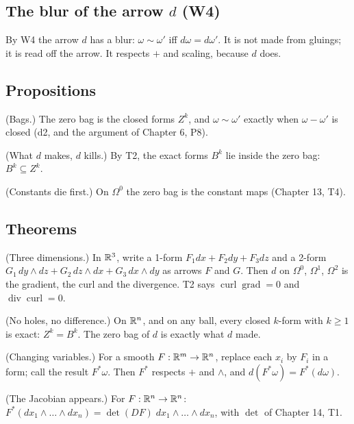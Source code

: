 \subsection*{The blur of the arrow $d$ (W4)}

By W4 the arrow $d$ has a blur: $\omega \sim \omega'$ iff $d\omega = d\omega'$. It is not made from gluings; it is read off the arrow. It respects $+$ and scaling, because $d$ does.

\subsection*{Propositions}

\begin{lines}
\item[\lab{P1}] (Bags.) The zero bag is the closed forms $Z^k$, and $\omega \sim \omega'$ exactly when $\omega - \omega'$ is closed (d2, and the argument of Chapter 6, P8).
\item[\lab{P2}] (What $d$ makes, $d$ kills.) By T2, the exact forms $B^k$ lie inside the zero bag: $B^k \subseteq Z^k$.
\item[\lab{P3}] (Constants die first.) On $\Omega^0$ the zero bag is the constant maps (Chapter 13, T4).
\end{lines}

\subsection*{Theorems}

\begin{lines}
\item[\lab{T3}] (Three dimensions.) In $\mathbb{R}^3$, write a 1-form $F_1 dx + F_2 dy + F_3 dz$ and a 2-form $G_1\, dy \wedge dz + G_2\, dz \wedge dx + G_3\, dx \wedge dy$ as arrows $F$ and $G$. Then $d$ on $\Omega^0$, $\Omega^1$, $\Omega^2$ is the gradient, the curl and the divergence. T2 says $\operatorname{curl} \operatorname{grad} = 0$ and $\operatorname{div} \operatorname{curl} = 0$.
\item[\lab{T4}] (No holes, no difference.) On $\mathbb{R}^n$, and on any ball, every closed $k$-form with $k \ge 1$ is exact: $Z^k = B^k$. The zero bag of $d$ is exactly what $d$ made.
\item[\lab{T5}] (Changing variables.) For a smooth $F : \mathbb{R}^m \to \mathbb{R}^n$, replace each $x_i$ by $F_i$ in a form; call the result $F^*\omega$. Then $F^*$ respects $+$ and $\wedge$, and $d(F^*\omega) = F^*(d\omega)$.
\item[\lab{T6}] (The Jacobian appears.) For $F : \mathbb{R}^n \to \mathbb{R}^n$: \ $F^*(dx_1 \wedge \dots \wedge dx_n) = \det(DF)\; dx_1 \wedge \dots \wedge dx_n$, with $\det$ of Chapter 14, T1.
\end{lines}

